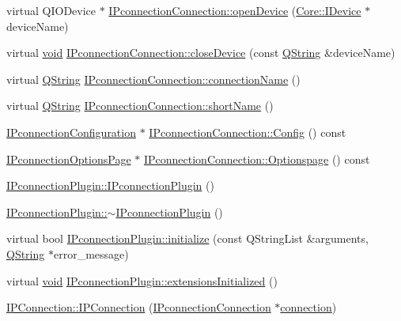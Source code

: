 \begin{DoxyCompactItemize}
virtual Q\-I\-O\-Device $\ast$ \hyperlink{group___i_p_conn_plugin_ga111b86b5f5905dee93d220a847614bed}{I\-Pconnection\-Connection\-::open\-Device} (\hyperlink{class_core_1_1_i_device}{Core\-::\-I\-Device} $\ast$device\-Name)
\item 
virtual \hyperlink{group___u_a_v_objects_plugin_ga444cf2ff3f0ecbe028adce838d373f5c}{void} \hyperlink{group___i_p_conn_plugin_gab576cdaa8af931b52cafea033a9c7350}{I\-Pconnection\-Connection\-::close\-Device} (const \hyperlink{group___u_a_v_objects_plugin_gab9d252f49c333c94a72f97ce3105a32d}{Q\-String} \&device\-Name)
\item 
virtual \hyperlink{group___u_a_v_objects_plugin_gab9d252f49c333c94a72f97ce3105a32d}{Q\-String} \hyperlink{group___i_p_conn_plugin_ga8709e871725c0d119edddd54db4c505c}{I\-Pconnection\-Connection\-::connection\-Name} ()
\item 
virtual \hyperlink{group___u_a_v_objects_plugin_gab9d252f49c333c94a72f97ce3105a32d}{Q\-String} \hyperlink{group___i_p_conn_plugin_gae18fe74813c61e299c3492ea3ac616c5}{I\-Pconnection\-Connection\-::short\-Name} ()
\item 
\hyperlink{class_i_pconnection_configuration}{I\-Pconnection\-Configuration} $\ast$ \hyperlink{group___i_p_conn_plugin_ga0e41970926f79a5f86cd89fe61075e03}{I\-Pconnection\-Connection\-::\-Config} () const 
\item 
\hyperlink{class_i_pconnection_options_page}{I\-Pconnection\-Options\-Page} $\ast$ \hyperlink{group___i_p_conn_plugin_ga8d119fd704cfcdca9ae8dc6c3a3c237b}{I\-Pconnection\-Connection\-::\-Optionspage} () const 
\item 
\hyperlink{group___i_p_conn_plugin_ga49199ecbe02c9b8fec0c2e0b1003d8ef}{I\-Pconnection\-Plugin\-::\-I\-Pconnection\-Plugin} ()
\item 
\hyperlink{group___i_p_conn_plugin_gad46085821e644ad2a37cf2b6f79d0883}{I\-Pconnection\-Plugin\-::$\sim$\-I\-Pconnection\-Plugin} ()
\item 
virtual bool \hyperlink{group___i_p_conn_plugin_ga66ca8127b859071b5c905aa9d0c22c55}{I\-Pconnection\-Plugin\-::initialize} (const Q\-String\-List \&arguments, \hyperlink{group___u_a_v_objects_plugin_gab9d252f49c333c94a72f97ce3105a32d}{Q\-String} $\ast$error\-\_\-message)
\item 
virtual \hyperlink{group___u_a_v_objects_plugin_ga444cf2ff3f0ecbe028adce838d373f5c}{void} \hyperlink{group___i_p_conn_plugin_ga61e1d618e2d1914fd8190687cf0017a5}{I\-Pconnection\-Plugin\-::extensions\-Initialized} ()
\item 
\hyperlink{group___i_p_conn_plugin_gac181aa5d3b59b0fab84380bea813691c}{I\-P\-Connection\-::\-I\-P\-Connection} (\hyperlink{class_i_pconnection_connection}{I\-Pconnection\-Connection} $\ast$\hyperlink{group___i_p_conn_plugin_ga75cb9b33b52928c030806876f2c2f439}{connection})
\end{DoxyCompactItemize}
